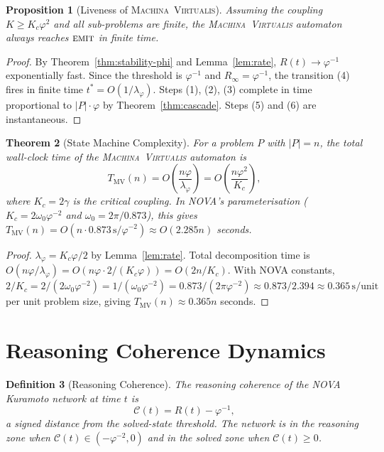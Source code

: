 \documentclass[12pt]{article}
\newtheorem{theorem}{Theorem}
\newtheorem{definition}[theorem]{Definition}
\newtheorem{proposition}[theorem]{Proposition}
\newcommand{\PHI}{\varphi}
\newcommand{\PHIINV}{\varphi^{-1}}
\newcommand{\AMOR}{\varphi^{-2}}
\newcommand{\MV}{\textsc{Machina~Virtualis}}
\begin{document}
\begin{proposition}[Liveness of \MV{}]
\label{prop:liveness}
Assuming the coupling $K \ge K_c\PHI^2$ and all sub-problems are finite, the
\MV{} automaton always reaches $\textsc{emit}$ in finite time.
\end{proposition}

\begin{proof}
By Theorem~\ref{thm:stability-phi} and Lemma~\ref{lem:rate}, $R(t) \to \PHIINV$
exponentially fast.  Since the threshold is $\PHIINV$ and $R_\infty = \PHIINV$,
the transition (4) fires in finite time $t^* = O(1/\lambda_\PHI)$.  Steps (1),
(2), (3) complete in time proportional to $|P| \cdot \PHI$ by
Theorem~\ref{thm:cascade}.  Steps (5) and (6) are instantaneous.
\end{proof}

\begin{theorem}[State Machine Complexity]
\label{thm:sm-complexity}
For a problem $P$ with $|P| = n$, the total wall-clock time of the \MV{}
automaton is
\[
  T_{\mathrm{MV}}(n) = O\!\left(\frac{n\PHI}{\lambda_\PHI}\right) =
  O\!\left(\frac{n\PHI^2}{K_c}\right),
\]
where $K_c = 2\gamma$ is the critical coupling.  In NOVA's parameterisation
($K_c = 2\omega_0\AMOR$ and $\omega_0 = 2\pi/0.873$), this gives
$T_{\mathrm{MV}}(n) = O(n \cdot 0.873\,\mathrm{s} / \AMOR) \approx O(2.285n)$
seconds.
\end{theorem}

\begin{proof}
$\lambda_\PHI = K_c\PHI/2$ by Lemma~\ref{lem:rate}.  Total decomposition
time is $O(n\PHI/\lambda_\PHI) = O(n\PHI \cdot 2/(K_c\PHI)) = O(2n/K_c)$.
With NOVA constants, $2/K_c = 2/(2\omega_0\AMOR) = 1/(\omega_0\AMOR) =
0.873/(2\pi\AMOR) \approx 0.873/2.394 \approx 0.365\,\mathrm{s}/\mathrm{unit}$
per unit problem size, giving $T_{\mathrm{MV}}(n) \approx 0.365n$ seconds.
\end{proof}

\section{Reasoning Coherence Dynamics}
\label{sec:dynamics}

\begin{definition}[Reasoning Coherence]
\label{def:coherence}
The \emph{reasoning coherence} of the NOVA Kuramoto network at time $t$ is
\[
  \mathcal{C}(t) = R(t) - \PHIINV,
\]
a signed distance from the solved-state threshold.  The network is in the
\emph{reasoning zone} when $\mathcal{C}(t) \in (-\AMOR, 0)$ and in the
\emph{solved zone} when $\mathcal{C}(t) \ge 0$.
\end{definition}
\end{document}
